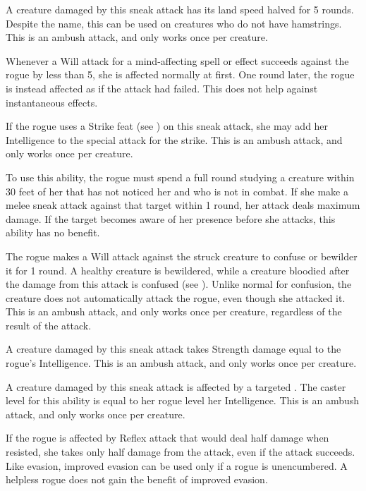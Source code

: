  A creature damaged by this sneak attack has its land speed halved for 5 rounds. Despite the name, this can be used on creatures who do not have hamstrings. This is an ambush attack, and only works once per creature.

 Whenever a Will attack for a mind-affecting spell or effect succeeds against the rogue by less than 5, she is affected normally at first. One round later, the rogue is instead affected as if the attack had failed. This does not help against instantaneous effects.

 If the rogue uses a Strike feat (see ) on this sneak attack, she may add her Intelligence to the special attack for the strike. This is an ambush attack, and only works once per creature.

 To use this ability, the rogue must spend a full round studying a creature within 30 feet of her that has not noticed her and who is not in combat. If she make a melee sneak attack against that target within 1 round, her attack deals maximum damage. If the target becomes aware of her presence before she attacks, this ability has no benefit.

 The rogue makes a Will attack against the struck creature to confuse or bewilder it for 1 round. A healthy creature is bewildered, while a creature bloodied after the damage from this attack is confused (see ). Unlike normal for confusion, the creature does not automatically attack the rogue, even though she attacked it. This is an ambush attack, and only works once per creature, regardless of the result of the attack.

 A creature damaged by this sneak attack takes Strength damage equal to the rogue's Intelligence. This is an ambush attack, and only works once per creature.

 A creature damaged by this sneak attack is affected by a targeted . The caster level for this ability is equal to her rogue level \add her Intelligence. This is an ambush attack, and only works once per creature.

 If the rogue is affected by Reflex attack that would deal half damage when resisted, she takes only half damage from the attack, even if the attack succeeds. Like evasion, improved evasion can be used only if a rogue is unencumbered. A helpless rogue does not gain the benefit of improved evasion.

